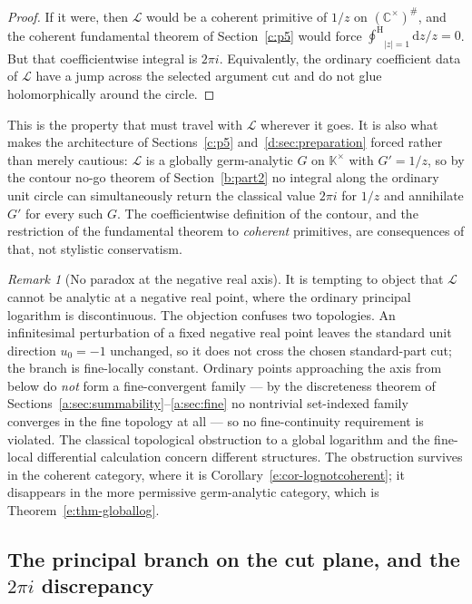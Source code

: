 \documentclass[11pt,a4paper]{article}
\numberwithin{equation}{section}
\theoremstyle{definition}
\theoremstyle{remark}
\newtheorem{remark}[theorem]{Remark}
\theoremstyle{plain}
\newcommand{\K}{\mathbb K}
\newcommand{\CC}{\mathbb C}
\newcommand{\halo}[1]{#1^{\#}}
\newcommand{\ointH}{{\oint^{\mathrm H}}}
\newcommand{\abs}[1]{\lvert #1\rvert}
\newcommand{\dd}{\mathrm d}
\begin{document}
\begin{proof}
If it were, then $\mathcal L$ would be a coherent primitive of $1/z$ on
$\halo{(\CC^{\times})}$, and the coherent fundamental theorem of Section~\ref{c:p5}
would force
$\ointH_{\abs z=1}\dd z/z=0$.  But that coefficientwise integral is
$2\pi i$.  Equivalently, the ordinary coefficient data of $\mathcal L$
have a jump across the selected argument cut and do not glue
holomorphically around the circle.
\end{proof}

This is the property that must travel with $\mathcal L$ wherever it goes.
It is also what makes the architecture of Sections~\ref{c:p5} and~\ref{d:sec:preparation} forced rather than
merely cautious: $\mathcal L$ is a globally germ-analytic $G$ on
$\K^{\times}$ with $G'=1/z$, so by the contour no-go theorem of Section~\ref{b:part2} no
integral along the ordinary unit circle can simultaneously return the
classical value $2\pi i$ for $1/z$ and annihilate $G'$ for every such $G$.
The coefficientwise definition of the contour, and the restriction of the
fundamental theorem to \emph{coherent} primitives, are consequences of
that, not stylistic conservatism.

\begin{remark}[No paradox at the negative real axis]\label{e:rem-noparadox}
It is tempting to object that $\mathcal L$ cannot be analytic at a
negative real point, where the ordinary principal logarithm is
discontinuous.  The objection confuses two topologies.  An infinitesimal
perturbation of a fixed negative real point leaves the standard unit
direction $u_0=-1$ unchanged, so it does not cross the chosen
standard-part cut; the branch is fine-locally constant.  Ordinary points
approaching the axis from below do \emph{not} form a fine-convergent
family --- by the discreteness theorem of Sections~\ref{a:sec:summability}--\ref{a:sec:fine} no nontrivial set-indexed
family converges in the fine topology at all --- so no fine-continuity
requirement is violated.  The classical topological obstruction to a
global logarithm and the fine-local differential calculation concern
different structures.  The obstruction survives in the coherent category,
where it is Corollary~\ref{e:cor-lognotcoherent}; it disappears in the more
permissive germ-analytic category, which is Theorem~\ref{e:thm-globallog}.
\end{remark}

\subsection{The principal branch on the cut plane, and the
\texorpdfstring{$2\pi i$}{2 pi i} discrepancy}\label{e:sec-principallog}
\end{document}
